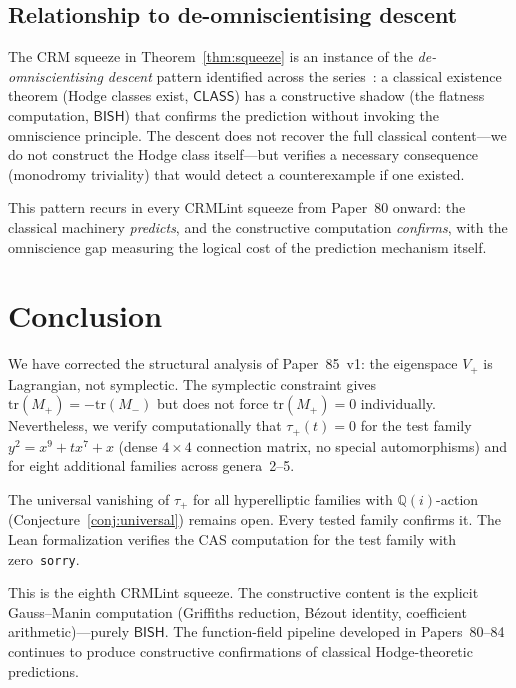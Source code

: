 \documentclass[11pt]{article}
\theoremstyle{plain}
\theoremstyle{definition}
\theoremstyle{remark}
\newcommand{\Q}{\mathbb{Q}}
\newcommand{\tr}{\mathrm{tr}}
\newcommand{\BISH}{\ensuremath{\mathsf{BISH}}}
\newcommand{\CLASS}{\ensuremath{\mathsf{CLASS}}}
\begin{document}
\subsection{Relationship to de-omniscientising descent}

The CRM squeeze in Theorem~\ref{thm:squeeze} is an instance of the
\emph{de-omniscientising descent} pattern identified across the
series~\cite{Lee2026p80, Lee2026p81}: a classical existence theorem
(Hodge classes exist, $\CLASS$) has a constructive shadow (the
flatness computation, $\BISH$) that confirms the prediction without
invoking the omniscience principle.  The descent does not recover
the full classical content---we do not construct the Hodge class
itself---but verifies a necessary consequence (monodromy
triviality) that would detect a counterexample if one existed.

This pattern recurs in every CRMLint squeeze from Paper~80 onward:
the classical machinery \emph{predicts}, and the constructive
computation \emph{confirms}, with the omniscience gap measuring
the logical cost of the prediction mechanism itself.

\section{Conclusion}\label{sec:conclusion}

We have corrected the structural analysis of Paper~85~v1: the
eigenspace $V_+$ is Lagrangian, not symplectic.  The symplectic
constraint gives $\tr(M_+) = -\tr(M_-)$ but does not force
$\tr(M_+) = 0$ individually.  Nevertheless, we verify computationally
that $\tau_+(t) = 0$ for the test family $y^2 = x^9 + tx^7 + x$
(dense $4 \times 4$ connection matrix, no special automorphisms)
and for eight additional families across genera~2--5.

The universal vanishing of $\tau_+$ for all hyperelliptic families
with $\Q(i)$-action (Conjecture~\ref{conj:universal}) remains open.
Every tested family confirms it.  The Lean formalization verifies the
CAS computation for the test family with zero~\texttt{sorry}.

This is the eighth CRMLint squeeze.  The constructive content is the
explicit Gauss--Manin computation (Griffiths reduction, B\'ezout
identity, coefficient arithmetic)---purely $\BISH$.  The function-field
pipeline developed in Papers~80--84 continues to produce
constructive confirmations of classical Hodge-theoretic predictions.
\end{document}
